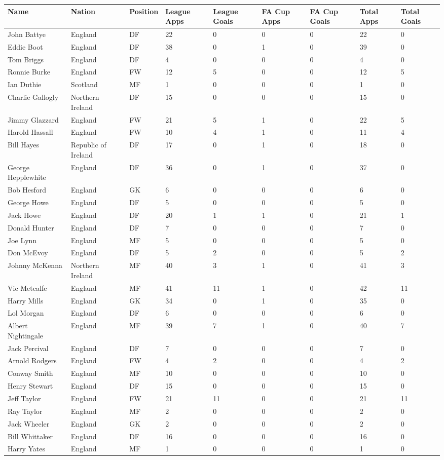 \documentclass{article}
\begin{document}
\begin{tabular}{lllllllll}
\toprule
Name & Nation & Position & League Apps & League Goals & FA Cup Apps & FA Cup Goals & Total Apps & Total Goals \\
\midrule
John Battye & England & DF & 22 & 0 & 0 & 0 & 22 & 0 \\
Eddie Boot & England & DF & 38 & 0 & 1 & 0 & 39 & 0 \\
Tom Briggs & England & DF & 4 & 0 & 0 & 0 & 4 & 0 \\
Ronnie Burke & England & FW & 12 & 5 & 0 & 0 & 12 & 5 \\
Ian Duthie & Scotland & MF & 1 & 0 & 0 & 0 & 1 & 0 \\
Charlie Gallogly & Northern Ireland & DF & 15 & 0 & 0 & 0 & 15 & 0 \\
Jimmy Glazzard & England & FW & 21 & 5 & 1 & 0 & 22 & 5 \\
Harold Hassall & England & FW & 10 & 4 & 1 & 0 & 11 & 4 \\
Bill Hayes & Republic of Ireland & DF & 17 & 0 & 1 & 0 & 18 & 0 \\
George Hepplewhite & England & DF & 36 & 0 & 1 & 0 & 37 & 0 \\
Bob Hesford & England & GK & 6 & 0 & 0 & 0 & 6 & 0 \\
George Howe & England & DF & 5 & 0 & 0 & 0 & 5 & 0 \\
Jack Howe & England & DF & 20 & 1 & 1 & 0 & 21 & 1 \\
Donald Hunter & England & DF & 7 & 0 & 0 & 0 & 7 & 0 \\
Joe Lynn & England & MF & 5 & 0 & 0 & 0 & 5 & 0 \\
Don McEvoy & England & DF & 5 & 2 & 0 & 0 & 5 & 2 \\
Johnny McKenna & Northern Ireland & MF & 40 & 3 & 1 & 0 & 41 & 3 \\
Vic Metcalfe & England & MF & 41 & 11 & 1 & 0 & 42 & 11 \\
Harry Mills & England & GK & 34 & 0 & 1 & 0 & 35 & 0 \\
Lol Morgan & England & DF & 6 & 0 & 0 & 0 & 6 & 0 \\
Albert Nightingale & England & MF & 39 & 7 & 1 & 0 & 40 & 7 \\
Jack Percival & England & DF & 7 & 0 & 0 & 0 & 7 & 0 \\
Arnold Rodgers & England & FW & 4 & 2 & 0 & 0 & 4 & 2 \\
Conway Smith & England & MF & 10 & 0 & 0 & 0 & 10 & 0 \\
Henry Stewart & England & DF & 15 & 0 & 0 & 0 & 15 & 0 \\
Jeff Taylor & England & FW & 21 & 11 & 0 & 0 & 21 & 11 \\
Ray Taylor & England & MF & 2 & 0 & 0 & 0 & 2 & 0 \\
Jack Wheeler & England & GK & 2 & 0 & 0 & 0 & 2 & 0 \\
Bill Whittaker & England & DF & 16 & 0 & 0 & 0 & 16 & 0 \\
Harry Yates & England & MF & 1 & 0 & 0 & 0 & 1 & 0 \\
\bottomrule
\end{tabular}
\end{document}
